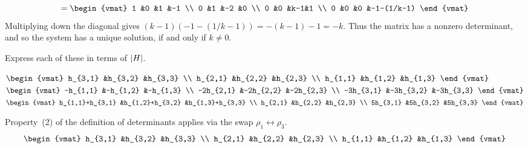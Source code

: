 \begin{exercises}
\begin{answer}
\begin{equation*}
         =
         \begin{vmat}
           1  &0  &1  &-1  \\
           0  &1  &-2 &0   \\
           0  &0  &k-1&1   \\
           0  &0  &0  &-1-(1/k-1)
         \end{vmat}
      \end{equation*}
      Multiplying down the diagonal gives $(k-1)(-1-(1/k-1))=-(k-1)-1=-k$.
      Thus the matrix has a nonzero determinant, and so the system
      has a unique solution, if and only if \( k\neq 0 \).  
    \end{answer}
  \recommended \item 
    Express each of these in terms of \( \deter{H} \).
    \begin{exparts}
      \partsitem \( \begin{vmat}
            h_{3,1}  &h_{3,2} &h_{3,3} \\
            h_{2,1}  &h_{2,2} &h_{2,3} \\
            h_{1,1}  &h_{1,2} &h_{1,3}
          \end{vmat} \)
      \partsitem \( \begin{vmat}
           -h_{1,1}   &-h_{1,2}  &-h_{1,3} \\
           -2h_{2,1}  &-2h_{2,2} &-2h_{2,3} \\
           -3h_{3,1}  &-3h_{3,2} &-3h_{3,3}
          \end{vmat} \)
      \partsitem \( \begin{vmat}
            h_{1,1}+h_{3,1}  &h_{1,2}+h_{3,2} &h_{1,3}+h_{3,3} \\
            h_{2,1}          &h_{2,2}         &h_{2,3} \\
            5h_{3,1}         &5h_{3,2}        &5h_{3,3}
          \end{vmat} \)
    \end{exparts}
    \begin{answer}
      \begin{exparts}
        \partsitem Property~(2) of the definition of determinants
          applies via the swap $\rho_1\leftrightarrow\rho_3$.
          \begin{equation*}
            \begin{vmat}
              h_{3,1}  &h_{3,2} &h_{3,3} \\
              h_{2,1}  &h_{2,2} &h_{2,3} \\
              h_{1,1}  &h_{1,2} &h_{1,3}

\end{vmat}
\end{equation*}
\end{exparts}
\end{answer}
\end{exercises}
